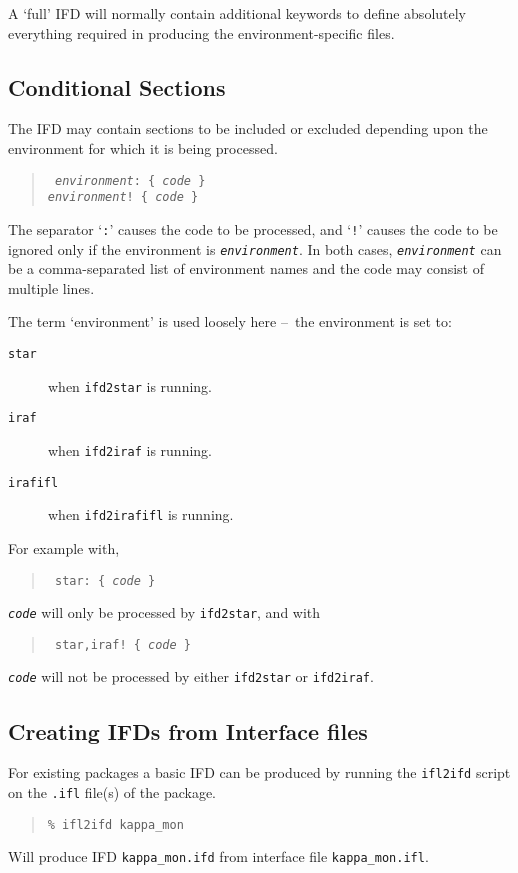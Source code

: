\documentclass[twoside,11pt]{article}
\newcommand{\htmlref}[2]{#1}
\newcommand{\xlabel}[1]{}
\newcommand{\dash}{--}
\newcommand{\dash}{-}
\begin{document}
A `full' IFD will normally contain additional keywords to define absolutely
everything required in producing the environment-specific files.

\subsection{\xlabel{conditional_sections}\label{conditional_sections}Conditional 
Sections}
The IFD may contain sections to be included or excluded depending upon the 
environment for which it is being processed. 
\begin{quote} {\tt
\textit{environment}: \{ \textit{code} \}\\
\textit{environment}! \{ \textit{code} \}
} \end{quote}
The separator `\texttt{:}' causes the code to be processed, and `\texttt{!}' 
causes the code to be ignored only if the environment is 
\texttt{\textit{environment}}.
In both cases, \texttt{\textit{environment}} can be a comma-separated list of 
environment names and the code may consist of multiple lines.

The term `environment' is used loosely here \dash\ the environment is set to:
\begin{description}
\item[\texttt{star}] when \htmlref{\texttt{ifd2star}}{ifd2star} is running.
\item[\texttt{iraf}] when \htmlref{\texttt{ifd2iraf}}{ifd2iraf} is running.
\item[\texttt{irafifl}] when \htmlref{\texttt{ifd2irafifl}}{ifd2irafifl} is 
running.
\end{description}

For example with, 
\begin{quote} {\tt
star: \{ \textit{code} \}
} \end{quote}
\texttt{\textit{code}} will only be processed by \texttt{ifd2star}, and with
\begin{quote} {\tt
star,iraf! \{ \textit{code} \}
} \end{quote}
\texttt{\textit{code}} will not be processed by either \texttt{ifd2star} or 
\texttt{ifd2iraf}.

\subsection{\xlabel{creating_ifds_from_interface_files}Creating IFDs from 
Interface files}
For existing packages a basic IFD can be produced by running the
\texttt{ifl2ifd} script on the \texttt{.ifl} file(s) of the package.
\begin{quote} \begin{verbatim}
% ifl2ifd kappa_mon
\end{verbatim} \end{quote}
Will produce IFD \texttt{kappa\_mon.ifd} from interface file 
\texttt{kappa\_mon.ifl}.
\end{document}
